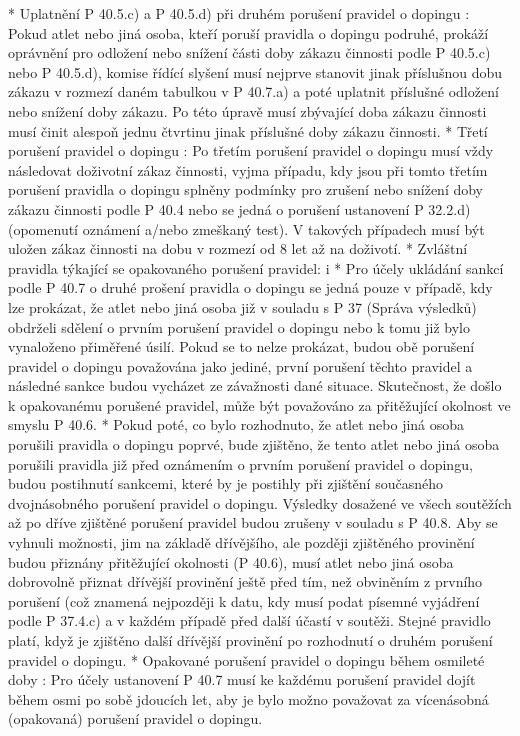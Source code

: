   * Uplatnění P 40.5.c) a P 40.5.d) při druhém porušení pravidel o dopingu : Pokud atlet nebo jiná osoba, kteří poruší pravidla o dopingu podruhé, prokáží oprávnění pro odložení nebo snížení části doby zákazu činnosti podle P 40.5.c) nebo P 40.5.d), komise řídící slyšení musí nejprve stanovit jinak příslušnou dobu zákazu v rozmezí daném tabulkou v P 40.7.a) a poté uplatnit příslušné odložení nebo snížení doby zákazu. Po této úpravě musí zbývající doba zákazu činnosti musí činit alespoň jednu čtvrtinu jinak příslušné doby zákazu činnosti.
  * Třetí porušení pravidel o dopingu :  Po třetím porušení pravidel o dopingu musí vždy následovat doživotní zákaz činnosti, vyjma případu,  kdy jsou při tomto třetím porušení pravidla o dopingu splněny podmínky pro zrušení nebo snížení doby zákazu činnosti podle P 40.4 nebo se jedná o porušení ustanovení P 32.2.d) (opomenutí oznámení a/nebo zmeškaný test). V takových případech musí být uložen zákaz činnosti na dobu v rozmezí od 8 let až na doživotí.
  * Zvláštní pravidla týkající se opakovaného porušení pravidel:
    \begitems \style i
    * Pro účely ukládání sankcí podle P 40.7 o druhé prošení pravidla o dopingu se jedná pouze v případě, kdy lze prokázat, že atlet nebo jiná osoba již v souladu s P 37 (Správa výsledků) obdrželi sdělení o prvním porušení pravidel o dopingu nebo k tomu již bylo vynaloženo přiměřené úsilí. Pokud se to nelze prokázat, budou obě porušení pravidel o dopingu považována jako jediné, první porušení těchto pravidel a následné sankce budou vycházet ze závažnosti dané situace. Skutečnost, že došlo k opakovanému porušené pravidel, může být považováno za přitěžující okolnost ve smyslu P 40.6.
    * Pokud poté, co bylo rozhodnuto, že atlet nebo jiná osoba porušili pravidla o dopingu poprvé, bude zjištěno, že tento atlet nebo jiná osoba porušili pravidla již před oznámením o prvním porušení pravidel o dopingu, budou postihnutí sankcemi, které by je postihly při zjištění současného dvojnásobného porušení pravidel o dopingu. Výsledky dosažené ve všech soutěžích až po dříve zjištěné porušení pravidel budou zrušeny v souladu s P 40.8. Aby se vyhnuli možnosti, jim na základě dřívějšího, ale později zjištěného provinění budou přiznány přitěžující okolnosti (P 40.6), musí atlet nebo jiná osoba dobrovolně přiznat dřívější provinění ještě před tím, než obviněním z prvního porušení (což znamená nejpozději k datu, kdy musí podat písemné vyjádření podle P 37.4.c) a v každém případě před další účastí v soutěži. Stejné pravidlo platí, když je zjištěno další dřívější provinění po rozhodnutí o druhém porušení pravidel o dopingu.
    \enditems
  * Opakované porušení pravidel o dopingu během osmileté doby : Pro účely ustanovení P 40.7 musí ke každému porušení pravidel dojít během osmi po sobě jdoucích let, aby je bylo možno považovat za vícenásobná (opakovaná) porušení pravidel o dopingu.
  \enditems

